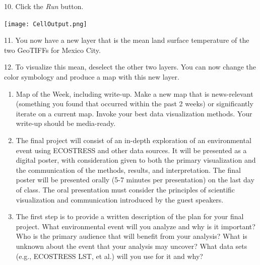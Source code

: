 \documentclass[oneside,a4paper,11pt,explicit]{book}
\begin{document}
10. Click the \textit{Run} button.

\vspace{.5em}

\centerline{\texttt{[image: CellOutput.png]}}

\vspace{.5em}

11. You now have a new layer that is the mean land surface temperature of the two GeoTIFFs for Mexico City.

12. To visualize this mean, deselect the other two layers. You can now change the color symbology and produce a map with this new layer. 


\begin{tcolorbox}[colback=yellow!5!white,colframe=IceCreamOrbit,title= \vspace{.2em} \Large Map of the Week Assignments]
	\large
	\begin{enumerate}
		\item Map of the Week, including write-up. Make a new map that is news-relevant (something you found that occurred within the past 2 weeks) or significantly iterate on a current map. Invoke your best data visualization methods. Your write-up should be media-ready.
		\item The final project will consist of an in-depth exploration of an environmental event using ECOSTRESS and other data sources. It will be presented as a digital poster, with consideration given to both the primary visualization and the communication of the methods, results, and interpretation. The final poster will be presented orally (5-7 minutes per presentation) on the last day of class. The oral presentation must consider the principles of scientific visualization and communication introduced by the guest speakers. 
            \item The first step is to provide a written description of the plan for your final project. What environmental event will you analyze and why is it important? Who is the primary audience that will benefit from your analysis? What is unknown about the event that your analysis may uncover? What data sets (e.g., ECOSTRESS LST, et al.) will you use for it and why?
	\end{enumerate}
\end{tcolorbox}
\end{document}
